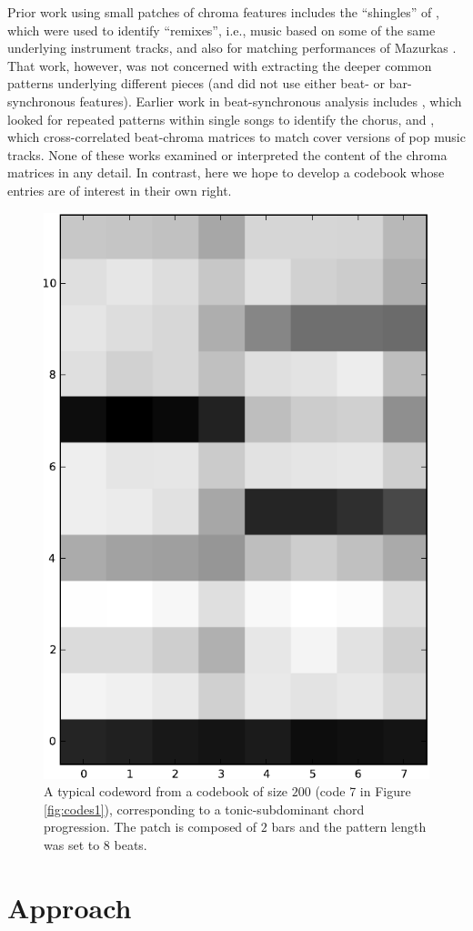 \documentclass{article}
\begin{document}
Prior work using small patches of chroma features includes
the ``shingles'' of \cite{Casey2007_small}, which were used to
identify ``remixes'', i.e., music based on some of the same
underlying instrument tracks, and also for matching
performances of Mazurkas \cite{Casey2008}.  That work,
however, was not concerned with extracting the deeper
common patterns underlying different pieces (and did not
use either beat- or bar-synchronous features).  Earlier work in
beat-synchronous analysis includes \cite{Bartsch2001_small},
which looked for repeated patterns within single songs to
identify the chorus, and \cite{Ellis2007a_small}, which 
cross-correlated beat-chroma matrices to match cover
versions of pop music tracks.  None of these works
examined or interpreted the content of the chroma
matrices in any detail.  In contrast, here we hope to
develop a codebook whose entries are of interest
in their own right.


\begin{figure}[thb]
\begin{center}
\includegraphics[width=.4\columnwidth]{code}
\end{center}
\caption{\small{A typical codeword from a codebook of size $200$ (code
    7 in Figure \ref{fig:codes1}), corresponding to a
    tonic-subdominant chord progression.  The patch is composed of $2$
    bars and the pattern length was set to $8$ beats.  }}
\label{fig:code}
\end{figure}


\section{Approach}\label{sec:approach}
\end{document}
